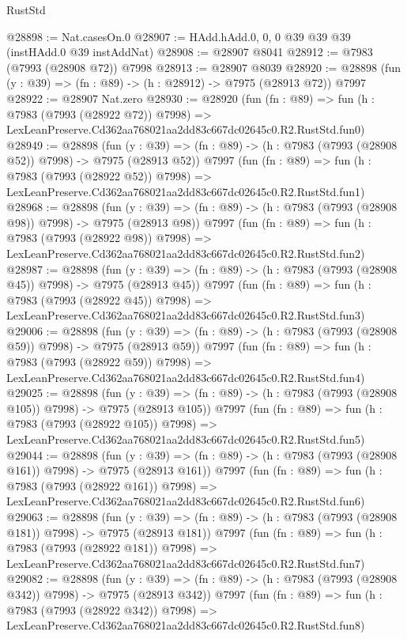 \begin{lexlean}{RustStd}
\begin{coremodule}
@28898 := Nat.casesOn.{0}
@28907 := HAdd.hAdd.{0, 0, 0} @39 @39 @39 (instHAdd.{0} @39 instAddNat)
@28908 := @28907 @8041
@28912 := @7983 (@7993 (@28908 @72)) @7998
@28913 := @28907 @8039
@28920 := @28898 (fun (y : @39) => (fn : @89) -> (h : @28912) -> @7975 (@28913 @72)) @7997
@28922 := @28907 Nat.zero
@28930 := @28920
    (fun (fn : @89) =>
    fun (h : @7983 (@7993 (@28922 @72)) @7998) =>
    LexLeanPreserve.Cd362aa768021aa2dd83c667dc02645c0.R2.RustStd.fun0)
@28949 := @28898
    (fun (y : @39) => (fn : @89) -> (h : @7983 (@7993 (@28908 @52)) @7998) -> @7975 (@28913 @52))
    @7997
    (fun (fn : @89) =>
    fun (h : @7983 (@7993 (@28922 @52)) @7998) =>
    LexLeanPreserve.Cd362aa768021aa2dd83c667dc02645c0.R2.RustStd.fun1)
@28968 := @28898
    (fun (y : @39) => (fn : @89) -> (h : @7983 (@7993 (@28908 @98)) @7998) -> @7975 (@28913 @98))
    @7997
    (fun (fn : @89) =>
    fun (h : @7983 (@7993 (@28922 @98)) @7998) =>
    LexLeanPreserve.Cd362aa768021aa2dd83c667dc02645c0.R2.RustStd.fun2)
@28987 := @28898
    (fun (y : @39) => (fn : @89) -> (h : @7983 (@7993 (@28908 @45)) @7998) -> @7975 (@28913 @45))
    @7997
    (fun (fn : @89) =>
    fun (h : @7983 (@7993 (@28922 @45)) @7998) =>
    LexLeanPreserve.Cd362aa768021aa2dd83c667dc02645c0.R2.RustStd.fun3)
@29006 := @28898
    (fun (y : @39) => (fn : @89) -> (h : @7983 (@7993 (@28908 @59)) @7998) -> @7975 (@28913 @59))
    @7997
    (fun (fn : @89) =>
    fun (h : @7983 (@7993 (@28922 @59)) @7998) =>
    LexLeanPreserve.Cd362aa768021aa2dd83c667dc02645c0.R2.RustStd.fun4)
@29025 := @28898
    (fun (y : @39) => (fn : @89) -> (h : @7983 (@7993 (@28908 @105)) @7998) -> @7975 (@28913 @105))
    @7997
    (fun (fn : @89) =>
    fun (h : @7983 (@7993 (@28922 @105)) @7998) =>
    LexLeanPreserve.Cd362aa768021aa2dd83c667dc02645c0.R2.RustStd.fun5)
@29044 := @28898
    (fun (y : @39) => (fn : @89) -> (h : @7983 (@7993 (@28908 @161)) @7998) -> @7975 (@28913 @161))
    @7997
    (fun (fn : @89) =>
    fun (h : @7983 (@7993 (@28922 @161)) @7998) =>
    LexLeanPreserve.Cd362aa768021aa2dd83c667dc02645c0.R2.RustStd.fun6)
@29063 := @28898
    (fun (y : @39) => (fn : @89) -> (h : @7983 (@7993 (@28908 @181)) @7998) -> @7975 (@28913 @181))
    @7997
    (fun (fn : @89) =>
    fun (h : @7983 (@7993 (@28922 @181)) @7998) =>
    LexLeanPreserve.Cd362aa768021aa2dd83c667dc02645c0.R2.RustStd.fun7)
@29082 := @28898
    (fun (y : @39) => (fn : @89) -> (h : @7983 (@7993 (@28908 @342)) @7998) -> @7975 (@28913 @342))
    @7997
    (fun (fn : @89) =>
    fun (h : @7983 (@7993 (@28922 @342)) @7998) =>
    LexLeanPreserve.Cd362aa768021aa2dd83c667dc02645c0.R2.RustStd.fun8)

\end{coremodule}
\end{lexlean}
